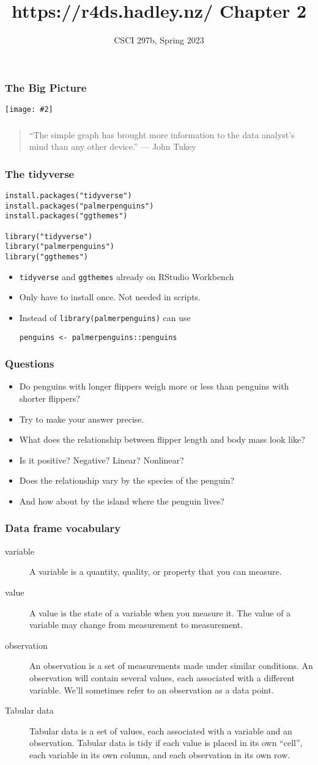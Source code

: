 \documentclass{beamer}
\title{{https://r4ds.hadley.nz/} Chapter 2}
\author{CSCI 297b, Spring 2023}
\newcommand{\bi}{\begin{itemize}}
\newcommand{\li}{\item}
\newcommand{\ei}{\end{itemize}}
\newcommand{\fig}[2]{\centerline{\texttt{[image: \#2]}}}
\newcommand{\bfr}[1]{\begin{frame}[fragile]\frametitle{{ #1 }}}
\begin{document}
\begin{frame}
\maketitle
\end{frame}

\bfr{The Big Picture}
\fig{1}{whole-game.png}
\end{frame}

\bfr{}
\begin{quotation}

“The simple graph has brought more information to the data analyst’s mind than any other device.” — John Tukey
\end{quotation}
\end{frame}

\bfr{The tidyverse}
\begin{verbatim}
install.packages("tidyverse")
install.packages("palmerpenguins")
install.packages("ggthemes")

library("tidyverse")
library("palmerpenguins")
library("ggthemes")
\end{verbatim}
\bi
\li {\tt tidyverse} and {\tt ggthemes} already on RStudio Workbench
\li Only have to install once.  Not needed in scripts.
\li Instead of  {\tt library(palmerpenguins)} can use
\begin{verbatim}
penguins <- palmerpenguins::penguins
\end{verbatim}
\ei
\end{frame}

\bfr{Questions}
\bi
\li Do penguins with longer flippers weigh more or less than penguins with 
shorter flippers? 
\li Try to make your answer precise. 
\li What does the relationship between flipper length and body mass look like? 
\li Is it positive? Negative? Linear? Nonlinear? 
\li Does the relationship vary by the species of the penguin? 
\li And how about by the island where the penguin lives? 
\ei
\end{frame}

\bfr{Data frame vocabulary}
\begin{description}
\li[variable] A variable is a quantity, quality, or property that you can measure.

\li[value]
A value is the state of a variable when you measure it. The value of a variable may change from measurement to measurement.

\li[observation]
An observation is a set of measurements made under similar conditions. An observation will contain several values, each associated with a different variable. We’ll sometimes refer to an observation as a data point.

\li[Tabular data]
Tabular data is a set of values, each associated with a variable and an observation. Tabular data is tidy if each value is placed in its own “cell”, each variable in its own column, and each observation in its own row.
\end{description}
\end{frame}
\end{document}
